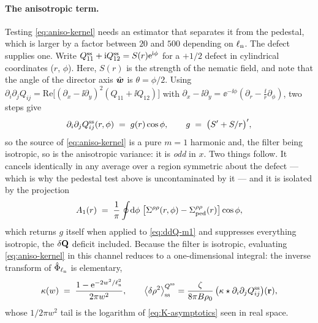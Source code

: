 \documentclass[a5paper]{article}
\begin{document}
\paragraph{The anisotropic term.} Testing \eqref{eq:aniso-kernel} needs an estimator that separates it from the pedestal, which is larger by a factor between $20$ and $500$ depending on $\elln$. The defect supplies one. Write $Q^\ss_{11}+\ii Q^\ss_{12} = S(r)\ee^{\ii\phi}$ for a $+1/2$ defect in cylindrical coordinates ($r$, $\phi$). Here, $S(r)$ is the strength of the nematic field, and note that the angle of the director axis $\hat{\bs w}$ is $\theta=\phi/2$. Using $\partial_i\partial_jQ_{ij} = \mathrm{Re}\bigl[(\partial_x-\ii\partial_y)^2(Q_{11}+\ii Q_{12})\bigr]$ with $\partial_x-\ii\partial_y = \ee^{-\ii\phi}(\partial_r-\tfrac{\ii}{r}\partial_\phi)$, two steps give
\begin{equation}
    \label{eq:ddQ-m1}
    \partial_i\partial_jQ^\ss_{ij}(r,\phi) \;=\; g(r)\cos\phi,
    \qquad g \;=\; \bigl(S' + S/r\bigr)' ,
\end{equation}
so the source of \eqref{eq:aniso-kernel} is a pure $m=1$ harmonic and, the filter being isotropic, so is the anisotropic variance: it is \emph{odd} in $x$. Two things follow. It cancels identically in any average over a region symmetric about the defect --- which is why the pedestal test above is uncontaminated by it --- and it is isolated by the projection
\begin{equation}
    \label{eq:A1-def}
    A_1(r) \;=\; \frac1\pi\oint\!\d\phi\;
    \bigl[\Sigma^{\rho\rho}(r,\phi)-\Sigma^{\rho\rho}_\mathrm{ped}(r)\bigr]\cos\phi ,
\end{equation}
which returns $g$ itself when applied to \eqref{eq:ddQ-m1} and suppresses everything isotropic, the $\delta\Q$ deficit included. Because the filter is isotropic, evaluating \eqref{eq:aniso-kernel} in this channel reduces to a one-dimensional integral: the inverse transform of $\hat\Phi_{\elln}$ is elementary,
\begin{equation}
    \label{eq:kappa-real}
    \kappa(w) \;=\; \frac{1-\ee^{-2w^2/\elln^2}}{2\pi w^2},
    \qquad
    \la\delta\rho^2\ra^{Q^\ss}_\ss = \frac{\zeta}{8\pi B\rho_0}\,\bigl(\kappa\star\partial_i\partial_jQ^\ss_{ij}\bigr)(\r),
\end{equation}
whose $1/2\pi w^2$ tail is the logarithm of \eqref{eq:K-asymptotics} seen in real space.
\end{document}

